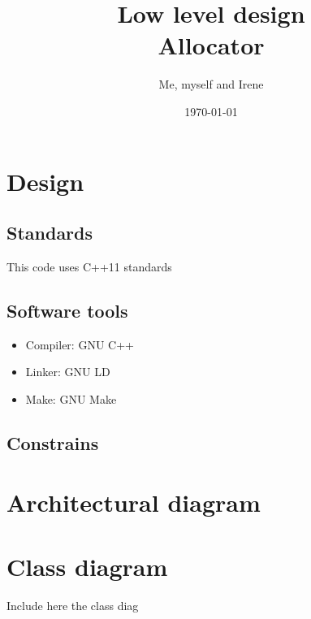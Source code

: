 \documentclass[a4paper,11pt]{article}
\title{Low level design \\
\large Allocator }
\author{ Me, myself and Irene  }
\date{\today}
\begin{document}
\maketitle
\newpage
\begin{versionhistory}
\end{versionhistory}
\setcounter{tocdepth}{4}
\setcounter{secnumdepth}{4}
\newpage
\tableofcontents{}
\listoffigures 
\listoftables
\printnoidxglossary[type=acronym]
\newpage


\section{Design}
\subsection{Standards}
This code uses C++11 standards

\subsection{Software tools}
\begin{itemize}
\item Compiler: GNU C++
\item Linker: GNU LD
\item Make: GNU Make
\end{itemize}

\subsection{Constrains}

\section{Architectural diagram}


\section{Class diagram}
Include here the class diag

\end{document}
